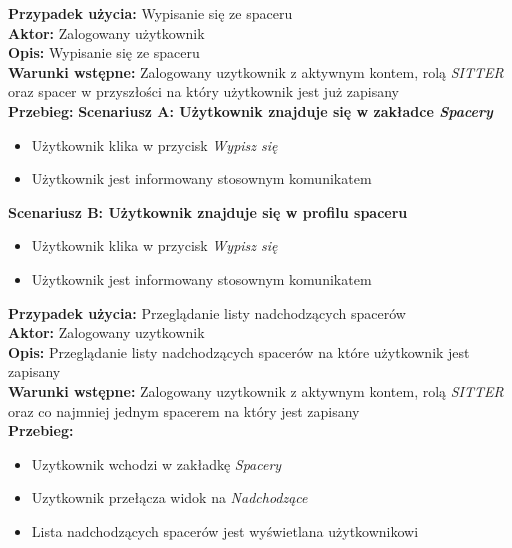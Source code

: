 \noindent
\textbf{Przypadek użycia:} Wypisanie się ze spaceru\\
\textbf{Aktor:} Zalogowany użytkownik\\
\textbf{Opis:} Wypisanie się ze spaceru\\
\textbf{Warunki wstępne:} Zalogowany uzytkownik z aktywnym kontem, rolą \textit{SITTER} oraz spacer w przyszłości na który użytkownik jest już zapisany\\
\textbf{Przebieg:}
\textbf{Scenariusz A: Użytkownik znajduje się w zakładce \textit{Spacery}}
\begin{itemize}
    \item Użytkownik klika w przycisk \textit{Wypisz się} 
    \item Użytkownik jest informowany stosownym komunikatem
\end{itemize}
\textbf{Scenariusz B: Użytkownik znajduje się w profilu spaceru}
\begin{itemize}
    \item Użytkownik klika w przycisk \textit{Wypisz się}
    \item Użytkownik jest informowany stosownym komunikatem
\end{itemize}

\noindent
\textbf{Przypadek użycia:} Przeglądanie listy nadchodzących spacerów\\
\textbf{Aktor:} Zalogowany uzytkownik\\
\textbf{Opis:} Przeglądanie listy nadchodzących spacerów na które użytkownik jest zapisany\\
\textbf{Warunki wstępne:} Zalogowany uzytkownik z aktywnym kontem, rolą \textit{SITTER} oraz co najmniej jednym spacerem na który jest zapisany\\
\textbf{Przebieg:}
\begin{itemize}
    \item Uzytkownik wchodzi w zakładkę \textit{Spacery}
    \item Uzytkownik przełącza widok na \textit{Nadchodzące}
    \item Lista nadchodzących spacerów jest wyświetlana użytkownikowi
\end{itemize}

